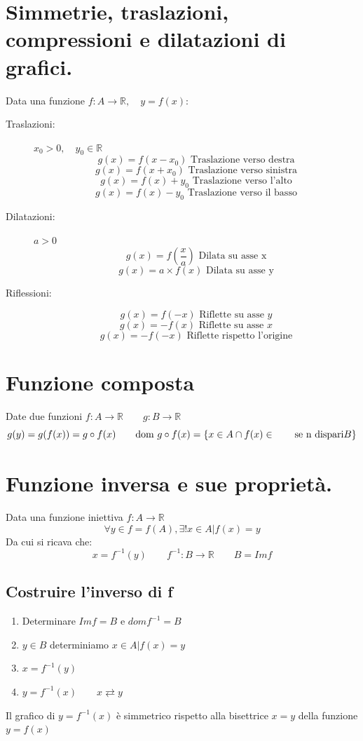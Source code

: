 \documentclass[11pt,a4paper,notitlepage]{report}
\let\numberset\mathbb
\newcommand{\R}{\numberset{R}}
\begin{document}
\section{Simmetrie, traslazioni, compressioni e dilatazioni di grafici.}
Data una funzione $f: A \rightarrow \R , \quad y=f(x)$:
\begin{description}
	\item[Traslazioni:] $x_0 > 0, \quad y_0 \in \R$
		\[g(x)=f(x-x_0) \text{ Traslazione verso destra}\]
		\[g(x)=f(x+x_0) \text{ Traslazione verso sinistra}\]
		\[g(x)=f(x)+y_0 \text{ Traslazione verso l'alto}\]
		\[g(x)=f(x)-y_0 \text{ Traslazione verso il basso}\]
	\item[Dilatazioni:] $a>0$
		\[g(x)=f(\frac{x}{a}) \text{ Dilata su asse x}\]
		\[g(x)=a\times f(x) \text{ Dilata su asse y}\]
	\item[Riflessioni:]
		\[g(x)=f(-x) \text{ Riflette su asse }y\]
		\[g(x)=-f(x) \text{ Riflette su asse }x\]
		\[g(x)=-f(-x) \text{ Riflette rispetto l'origine}\]
\end{description}

\section{Funzione composta}
Date due funzioni $f:A\rightarrow \R \qquad g:B\rightarrow \R$
\[g(y)=g(f(x))=g\circ f(x) \qquad \text{dom }g\circ f(x)=\{x\in A \cap f(x) \in \qquad \text{se n dispari} \\ B\}\]

\section{Funzione inversa e sue proprietà.}
Data una funzione iniettiva $f:A\rightarrow \R$
\[\forall y \in f=f(A), \exists ! x\in A | f(x)=y\]
Da cui si ricava che:
\[x=f^{-1}(y) \qquad f^{-1}: B\rightarrow \R \qquad B=Im f\]
\subsection{Costruire l'inverso di f}
\begin{enumerate}
	\item Determinare $Im f=B$ e $dom f^{-1}=B$
	\item $y \in B$ determiniamo $x \in A | f(x)=y$
	\item $x=f^{-1}(y)$
	\item $y=f^{-1}(x) \qquad x\rightleftarrows y$
\end{enumerate}
Il grafico di $y=f^{-1}(x)$ è simmetrico rispetto alla bisettrice $x=y$ della funzione $y=f(x)$
\end{document}
